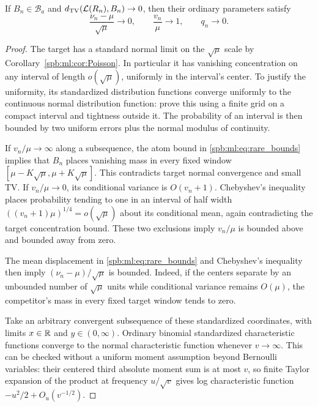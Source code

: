 \begin{lemma}\label{spb:ml:lem:coarse}
If $B_n\in\mathcal B_a$ and $d_{\mathrm{TV}}(\mathcal L(R_n),B_n)\to0$, then their ordinary parameters satisfy
\begin{equation}\label{spb:ml:eq:coarse}
 \frac{\nu_n-\mu}{\sqrt\mu}\to0,\qquad \frac{v_n}{\mu}\to1,
 \qquad q_n\to0.
\end{equation}
\end{lemma}
\begin{proof}
The target has a standard normal limit on the $\sqrt\mu$ scale by Corollary~\ref{spb:ml:cor:Poisson}. In particular it has vanishing concentration on any interval of length $o(\sqrt\mu)$, uniformly in the interval's center. To justify the uniformity, its standardized distribution functions converge uniformly to the continuous normal distribution function: prove this using a finite grid on a compact interval and tightness outside it. The probability of an interval is then bounded by two uniform errors plus the normal modulus of continuity.

If $v_n/\mu\to\infty$ along a subsequence, the atom bound in \eqref{spb:ml:eq:rare_bounds} implies that $B_n$ places vanishing mass in every fixed window $[\mu-K\sqrt\mu,\mu+K\sqrt\mu]$. This contradicts target normal convergence and small TV. If $v_n/\mu\to0$, its conditional variance is $O(v_n+1)$. Chebyshev's inequality places probability tending to one in an interval of half width $((v_n+1)\mu)^{1/4}=o(\sqrt\mu)$ about its conditional mean, again contradicting the target concentration bound. These two exclusions imply $v_n/\mu$ is bounded above and bounded away from zero.

The mean displacement in \eqref{spb:ml:eq:rare_bounds} and Chebyshev's inequality then imply $(\nu_n-\mu)/\sqrt\mu$ is bounded. Indeed, if the centers separate by an unbounded number of $\sqrt\mu$ units while conditional variance remains $O(\mu)$, the competitor's mass in every fixed target window tends to zero.

Take an arbitrary convergent subsequence of these standardized coordinates, with limits $x\in\mathbb R$ and $y\in(0,\infty)$. Ordinary binomial standardized characteristic functions converge to the normal characteristic function whenever $v\to\infty$. This can be checked without a uniform moment assumption beyond Bernoulli variables: their centered third absolute moment sum is at most $v$, so finite Taylor expansion of the product at frequency $u/\sqrt v$ gives log characteristic function $-u^2/2+O_u(v^{-1/2})$.


\end{proof}
